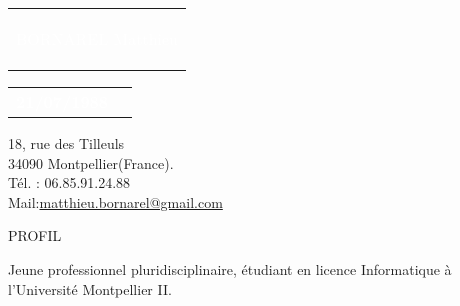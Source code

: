 \documentclass[a4paper]{article}
\begin{document}
\pagestyle {plain}%




\begin{center} 
\begin{tabular}{|p{21cm}}
\hline 
\rowcolor[gray]{0.5}
\begin{center}
\textcolor{white}{{\Huge BORNAREL   Matthieu}}
\end{center}
\end{tabular}








\begin{tabular}{|c|p{17.73cm}}




\hline 
\rowcolor{black}
    \arrayrulecolor[gray]{0.5}
\textcolor{white}{\Large \textbf{21/07/1988}} &




\end{tabular}




\end{center}








\begin{center}




\noindent 
{\large 18, rue des Tilleuls} \\
{\large 34090 Montpellier(France).}\\
{\large Tél. : 06.85.91.24.88}\\
{\large Mail:\underline{matthieu.bornarel@gmail.com}} 
\end{center}








\noindent
\newline




\textcolor[gray]{0.6}{{\Large  PROFIL}}




\noindent 
\newline %
\hspace*{0.5cm} Jeune professionnel pluridisciplinaire, étudiant en licence Informatique à l'Université Montpellier II.\\
\newline
\end{document}
